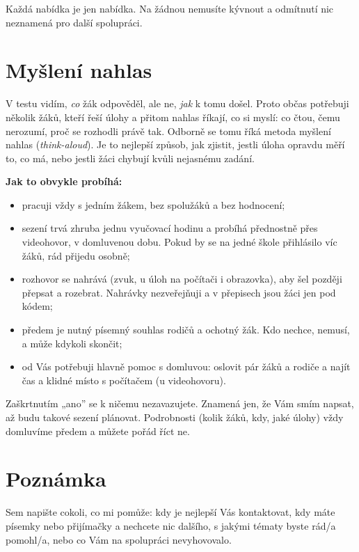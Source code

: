 \documentclass[
  12pt,
  english,
  a4paper,
  extrafontsizes,onecolumn,openright
  ]{memoir}
\providecommand{\tightlist}{%
  \setlength{\itemsep}{0pt}\setlength{\parskip}{0pt}}
\begin{document}
Každá nabídka je jen nabídka. Na žádnou nemusíte kývnout a odmítnutí
nic neznamená pro další spolupráci.

\section{Myšlení nahlas}\label{mysleni-nahlas}

V testu vidím, \emph{co} žák odpověděl, ale ne, \emph{jak} k tomu došel. Proto
občas potřebuji několik žáků, kteří řeší úlohy a přitom nahlas říkají,
co si myslí: co čtou, čemu nerozumí, proč se rozhodli právě tak. Odborně
se tomu říká metoda myšlení nahlas (\emph{think-aloud}). Je to nejlepší
způsob, jak zjistit, jestli úloha opravdu měří to, co má, nebo jestli
žáci chybují kvůli nejasnému zadání.

\textbf{Jak to obvykle probíhá:}

\begin{itemize}
\tightlist
\item
  pracuji vždy s jedním žákem, bez spolužáků a bez hodnocení;
\item
  sezení trvá zhruba jednu vyučovací hodinu a probíhá přednostně
  přes videohovor, v domluvenou dobu. Pokud by se na jedné škole
  přihlásilo víc žáků, rád přijedu osobně;
\item
  rozhovor se nahrává (zvuk, u úloh na počítači i obrazovka), aby šel
  později přepsat a rozebrat. Nahrávky nezveřejňuji a v přepisech jsou
  žáci jen pod kódem;
\item
  předem je nutný písemný souhlas rodičů a ochotný žák. Kdo nechce,
  nemusí, a může kdykoli skončit;
\item
  od Vás potřebuji hlavně pomoc s domluvou: oslovit pár žáků a rodiče
  a najít čas a klidné místo s počítačem (u videohovoru).
\end{itemize}

Zaškrtnutím „ano'' se k ničemu nezavazujete. Znamená jen, že Vám smím
napsat, až budu takové sezení plánovat. Podrobnosti (kolik žáků, kdy,
jaké úlohy) vždy domluvíme předem a můžete pořád říct ne.

\section{Poznámka}\label{spoluprace-poznamka}

Sem napište cokoli, co mi pomůže: kdy je nejlepší Vás kontaktovat,
kdy máte písemky nebo přijímačky a nechcete nic dalšího, s jakými
tématy byste rád/a pomohl/a, nebo co Vám na spolupráci nevyhovovalo.
\end{document}
